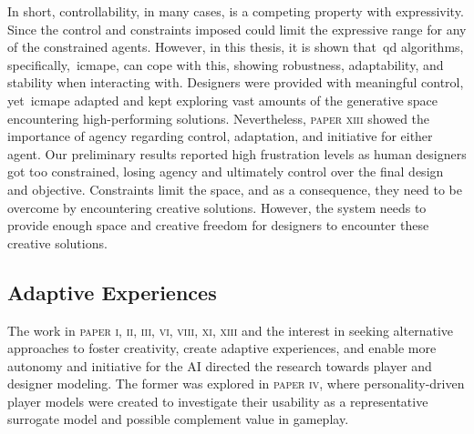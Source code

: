 

In short, controllability, in many cases, is a competing property with expressivity. Since the control and constraints imposed could limit the expressive range for any of the constrained agents. However, in this thesis, it is shown that~\acrshort{qd} algorithms, specifically,~\acrshort{icmape}, can cope with this, showing robustness, adaptability, and stability when interacting with. Designers were provided with meaningful control, yet~\acrshort{icmape} adapted and kept exploring vast amounts of the generative space encountering high-performing solutions. Nevertheless, \textsc{paper xiii} showed the importance of agency regarding control, adaptation, and initiative for either agent. Our preliminary results reported high frustration levels as human designers got too constrained, losing agency and ultimately control over the final design and objective. Constraints limit the space, and as a consequence, they need to be overcome by encountering creative solutions. However, the system needs to provide enough space and creative freedom for designers to encounter these creative solutions.




\subsection{Adaptive Experiences}

The work in \textsc{paper i, ii, iii,  vi, viii, xi, xiii} and the interest in seeking alternative approaches to foster creativity, create adaptive experiences, and enable more autonomy and initiative for the AI directed the research towards player and designer modeling. The former was explored in \textsc{paper iv}, where personality-driven player models were created to investigate their usability as a representative surrogate model and possible complement value in gameplay. 

